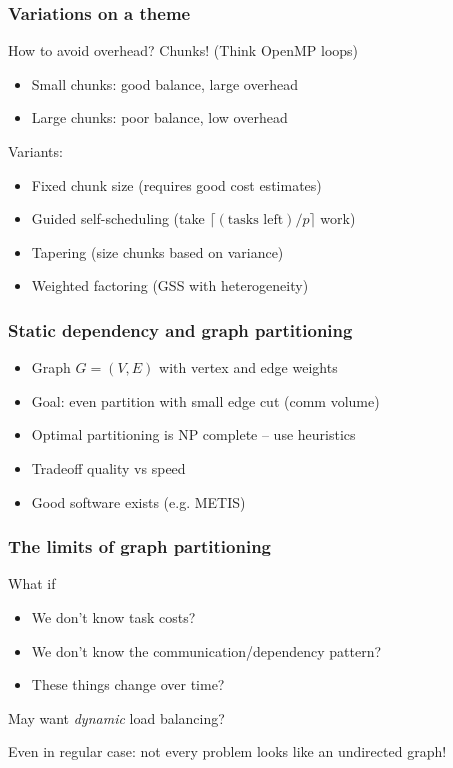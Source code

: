 \documentclass{beamer}
\begin{document}
\begin{frame}
  \frametitle{Variations on a theme}

  How to avoid overhead?  Chunks!  (Think OpenMP loops)
  \begin{itemize}
  \item Small chunks: good balance, large overhead
  \item Large chunks: poor balance, low overhead
  \end{itemize}
  Variants:
    \begin{itemize}
    \item Fixed chunk size (requires good cost estimates)
    \item Guided self-scheduling (take $\lceil (\mbox{tasks left})/p \rceil$ work)
    \item Tapering (size chunks based on variance)
    \item Weighted factoring (GSS with heterogeneity)
    \end{itemize}
\end{frame}


\begin{frame}
  \frametitle{Static dependency and graph partitioning}

  \begin{center}
    \begin{tikzpicture}
      
    \end{tikzpicture}
  \end{center}
    
  \begin{itemize}
  \item Graph $G = (V,E)$ with vertex and edge weights
  \item Goal: even partition with small edge cut (comm volume)
  \item Optimal partitioning is NP complete -- use heuristics
  \item Tradeoff quality vs speed
  \item Good software exists (e.g. METIS)
  \end{itemize}
\end{frame}


\begin{frame}
  \frametitle{The limits of graph partitioning}

  What if 
  \begin{itemize}
  \item We don't know task costs?
  \item We don't know the communication/dependency pattern?
  \item These things change over time?
  \end{itemize}
  May want {\em dynamic} load balancing?

  \vspace{5mm}
  Even in regular case: not every problem looks like an undirected graph!

\end{frame}
\end{document}
